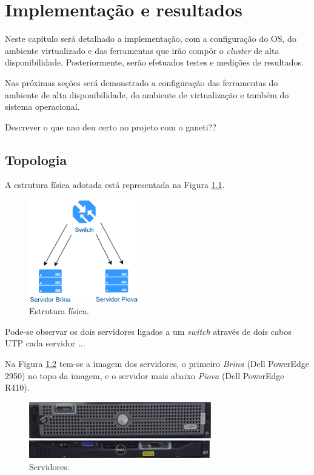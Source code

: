 \chapter{Implementação e resultados}
\label{cap:implementacaoresultados}

Neste capítulo será detalhado a implementação, com a configuração do \ac{OS}, do ambiente virtualizado e das ferramentas que irão compôr o
\textit{cluster} de alta disponibilidade. Posteriormente, serão efetuados testes e medições de resultados.

Nas próximas seções será demonstrado a configuração das ferramentas do ambiente de alta disponibilidade, do ambiente de virtualização e 
também do sistema operacional.

Descrever o que nao deu certo no projeto com o ganeti??

\section{Topologia}

A estrutura física adotada está representada na Figura \ref{fig:projeto_fisico}.

\begin{figure}[h!]
 \centering
 \includegraphics[width=180px]{img/projeto_fisico.eps}
 \caption{Estrutura física.}
 \label{fig:projeto_fisico}
\end{figure}

Pode-se observar os dois servidores ligados a um \textit{switch} através de dois cabos UTP cada servidor ...

Na Figura \ref{fig:servidores_brina_piova} tem-se a imagem dos servidores, o primeiro \textit{Brina} (Dell PowerEdge 2950) no topo da imagem, e o servidor mais abaixo 
\textit{Piova} (Dell PowerEdge R410).

\begin{figure}[h!]
 \centering
 \includegraphics[width=300px]{img/servidores_brina_piova.eps}
 \caption{Servidores.}
 \label{fig:servidores_brina_piova}
\end{figure}

